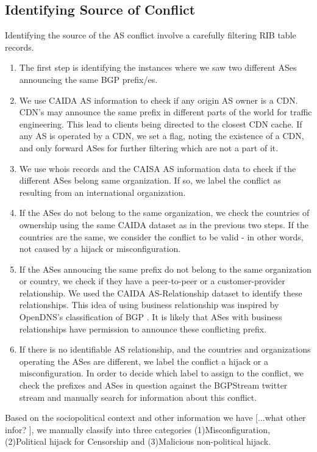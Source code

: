 \subsection{Identifying Source of Conflict}
Identifying the source of the AS conflict involve a carefully filtering RIB table records. 
\begin{enumerate}
\item The first step is identifying the instances where we saw two different ASes announcing the same BGP prefix/es.
\item We use CAIDA AS information to check if any origin AS owner is a CDN. CDN's may announce the same prefix in different parts of the world for traffic engineering. This lead to clients being directed to the closest CDN cache. If any AS is operated by a CDN, we set a flag, noting the existence of a CDN, and only forward ASes for further filtering which are not a part of it. 
\item We use whois records and the CAISA AS information data  to check if the different ASes belong same organization. If so, we label the conflict as resulting from an international organization.
\item If the ASes do not belong to the same organization, we check the countries of ownership using the same CAIDA dataset as in the previous two steps. If the countries are the same, we consider the conflict to be valid - in other words, not caused by a hijack or misconfiguration.
\item If the ASes annoucing the same prefix do not belong to the same organization or country, we check if they have a peer-to-peer or a customer-provider relationship. We used the CAIDA AS-Relationship dataset to identify these relationships. This idea of using business relationship was inspired by OpenDNS's classification of BGP \cite{opendns_blackhat_2015}. It is likely that ASes with business relationships have permission to announce these conflicting prefix. 
\item If there is no identifiable AS relationship, and the countries and organizations operating the ASes are different, we label the conflict a hijack or a misconfiguration. In order to decide which label to assign to the conflict, we check the prefixes and ASes in question against the BGPStream twitter stream and manually search for information about this conflict.
\end{enumerate}

Based on the sociopolitical context and other information we have [...what other infor? ], we manually classify into three categories (1)Misconfiguration, (2)Political hijack for Censorship and (3)Malicious non-political hijack. 

